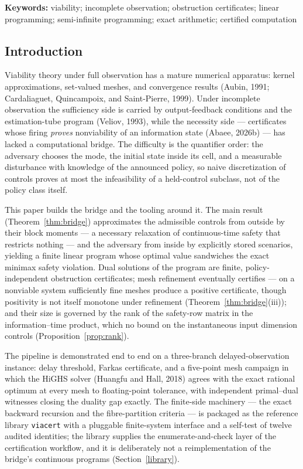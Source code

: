 \documentclass[10pt,twocolumn]{article}
\theoremstyle{plain}
\theoremstyle{definition}
\theoremstyle{remark}
\begin{document}
\textbf{Keywords:} viability; incomplete observation; obstruction
certificates; linear programming; semi-infinite programming; exact
arithmetic; certified computation

\subsection{Introduction}\label{introduction}

Viability theory under full observation has a mature numerical apparatus:
kernel approximations, set-valued meshes, and convergence results
(Aubin, 1991; Cardaliaguet, Quincampoix, and Saint-Pierre, 1999). Under
incomplete observation the sufficiency side is carried by output-feedback
conditions and the estimation-tube program (Veliov, 1993), while the
necessity side --- certificates whose firing \emph{proves} nonviability of an
information state (Abaee, 2026b) --- has lacked a computational bridge. The
difficulty is the quantifier order: the adversary chooses the mode, the
initial state inside its cell, and a measurable disturbance with knowledge of
the announced policy, so naive discretization of controls proves at most the
infeasibility of a held-control subclass, not of the policy class itself.

This paper builds the bridge and the tooling around it. The main result
(Theorem~\ref{thm:bridge}) approximates the admissible controls from outside
by their block moments --- a necessary relaxation of continuous-time safety
that restricts nothing --- and the adversary from inside by explicitly stored
scenarios, yielding a finite linear program whose optimal value sandwiches
the exact minimax safety violation. Dual solutions of the program are finite,
policy-independent obstruction certificates; mesh refinement eventually
certifies --- on a nonviable system sufficiently fine meshes produce a
positive certificate, though positivity is not itself monotone under
refinement (Theorem~\ref{thm:bridge}(iii)); and their size is governed by
the rank of the
safety-row matrix in the information--time product, which no bound on the
instantaneous input dimension controls (Proposition~\ref{prop:rank}).

The pipeline is demonstrated end to end on a three-branch
delayed-observation instance: delay threshold, Farkas certificate, and a
five-point mesh campaign in which the HiGHS solver (Huangfu and Hall, 2018)
agrees with the exact rational optimum at every mesh to floating-point
tolerance, with independent
primal--dual witnesses closing the duality gap exactly. The finite-side
machinery --- the exact backward recursion and the fibre-partition criteria
--- is packaged as the reference library \texttt{viacert} with a pluggable
finite-system interface and a self-test of twelve audited identities; the
library supplies the enumerate-and-check layer of the certification
workflow, and it is deliberately not a reimplementation of the bridge's
continuous programs (Section~\ref{library}).
\end{document}
